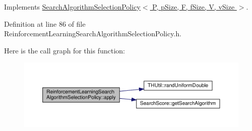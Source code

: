 Implements \hyperlink{classSearchAlgorithmSelectionPolicy_a0f316179ba1d9590efa74cac86eac777}{Search\+Algorithm\+Selection\+Policy$<$ P, p\+Size, F, f\+Size, V, v\+Size $>$}.



Definition at line 86 of file Reinforcement\+Learning\+Search\+Algorithm\+Selection\+Policy.\+h.



Here is the call graph for this function\+:
\nopagebreak
\begin{figure}[H]
\begin{center}
\leavevmode
\includegraphics[width=350pt]{classReinforcementLearningSearchAlgorithmSelectionPolicy_a4bd477b9e70030b13bc214cec3fa71d1_cgraph}
\end{center}
\end{figure}


